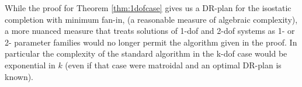 

\begin{observation}
\label{obs:algebraic_completion}
    While the proof for Theorem \ref{thm:1dofcase} gives us a DR-plan for
    the isostatic completion with minimum fan-in, (a reasonable
    measure of algebraic complexity), a more nuanced
    measure that treats solutions of 1-dof and 2-dof systems as
    1- or 2- parameter families would no longer permit the algorithm given
    in the proof. In particular the complexity of the standard algorithm in the k-dof
    case would be exponential in $k$ (even if that case were matroidal and
    an optimal DR-plan is known).
\end{observation}




